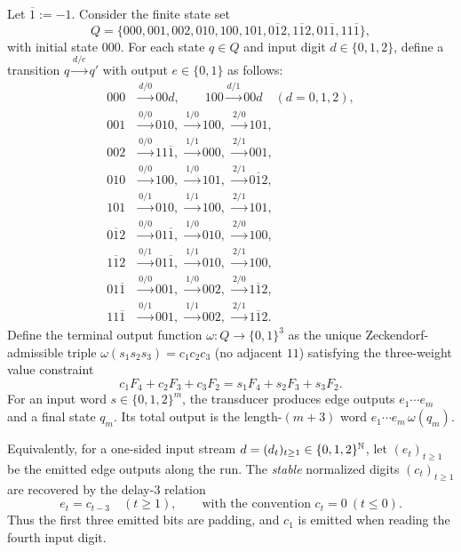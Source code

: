 \begin{definition}\label{def:delay3-transducer}
Let $\overline{1}:=-1$.
Consider the finite state set
\[
Q=\{000,001,002,010,100,101,0\overline{1}2,1\overline{1}2,01\overline{1},11\overline{1}\},
\]
with initial state $000$.
For each state $q\in Q$ and input digit $d\in\{0,1,2\}$, define a transition $q\xrightarrow{d/e}q'$ with output $e\in\{0,1\}$ as follows:
\[
\begin{aligned}
000&\xrightarrow{d/0}00d,\qquad 100\xrightarrow{d/1}00d\quad(d=0,1,2),\\
001&\xrightarrow{0/0}010,\ \xrightarrow{1/0}100,\ \xrightarrow{2/0}101,\\
002&\xrightarrow{0/0}11\overline{1},\ \xrightarrow{1/1}000,\ \xrightarrow{2/1}001,\\
010&\xrightarrow{0/0}100,\ \xrightarrow{1/0}101,\ \xrightarrow{2/1}0\overline{1}2,\\
101&\xrightarrow{0/1}010,\ \xrightarrow{1/1}100,\ \xrightarrow{2/1}101,\\
0\overline{1}2&\xrightarrow{0/0}01\overline{1},\ \xrightarrow{1/0}010,\ \xrightarrow{2/0}100,\\
1\overline{1}2&\xrightarrow{0/1}01\overline{1},\ \xrightarrow{1/1}010,\ \xrightarrow{2/1}100,\\
01\overline{1}&\xrightarrow{0/0}001,\ \xrightarrow{1/0}002,\ \xrightarrow{2/0}1\overline{1}2,\\
11\overline{1}&\xrightarrow{0/1}001,\ \xrightarrow{1/1}002,\ \xrightarrow{2/1}1\overline{1}2.
\end{aligned}
\]
Define the terminal output function $\omega:Q\to\{0,1\}^3$ as the unique Zeckendorf-admissible
triple $\omega(s_1s_2s_3)=c_1c_2c_3$ (no adjacent $11$) satisfying the three-weight value constraint
\begin{equation}\label{eq:online-terminal-omega}
c_1F_4+c_2F_3+c_3F_2=s_1F_4+s_2F_3+s_3F_2.
\end{equation}
For an input word $s\in\{0,1,2\}^m$, the transducer produces edge outputs $e_1\cdots e_m$ and a final state $q_m$.
Its total output is the length-$(m+3)$ word
\(
e_1\cdots e_m\,\omega(q_m).
\)
\par
Equivalently, for a one-sided input stream $d=(d_t)_{t\ge 1}\in\{0,1,2\}^{\mathbb{N}}$, let $(e_t)_{t\ge 1}$ be the emitted edge outputs along the run.
The \emph{stable} normalized digits $(c_t)_{t\ge 1}$ are recovered by the delay-$3$ relation
\[
e_t=c_{t-3}\quad(t\ge 1),
\qquad\text{with the convention }c_t=0\ (t\le 0).
\]
Thus the first three emitted bits are padding, and $c_1$ is emitted when reading the fourth input digit.
\end{definition}

